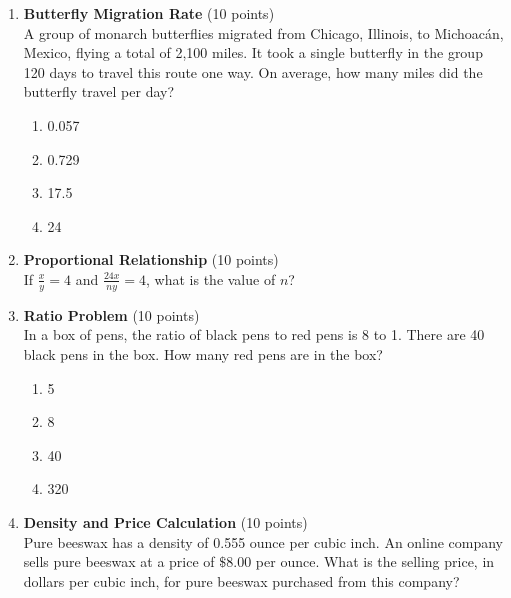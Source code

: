 \begin{enumerate}
  \item \textbf{Butterfly Migration Rate} (10 points)\\
  A group of monarch butterflies migrated from Chicago, Illinois, to Michoacán, Mexico, flying a total of 2,100 miles. It took a single butterfly in the group 120 days to travel this route one way. On average, how many miles did the butterfly travel per day?
  \begin{enumerate}[label=(\Alph*)]
    \item 0.057
    \item 0.729
    \item 17.5
    \item 24
  \end{enumerate}
  \begin{subanswer}
  \end{subanswer}

  \item \textbf{Proportional Relationship} (10 points)\\
  If $\frac{x}{y}=4$ and $\frac{24 x}{n y}=4$, what is the value of $n$?
  \begin{subanswer}
  \end{subanswer}

  \item \textbf{Ratio Problem} (10 points)\\
  In a box of pens, the ratio of black pens to red pens is 8 to 1. There are 40 black pens in the box. How many red pens are in the box?
  \begin{enumerate}[label=(\Alph*)]
    \item 5
    \item 8
    \item 40
    \item 320
  \end{enumerate}
  \begin{subanswer}
  \end{subanswer}

  \item \textbf{Density and Price Calculation} (10 points)\\
  Pure beeswax has a density of 0.555 ounce per cubic inch. An online company sells pure beeswax at a price of $\$ 8.00$ per ounce. What is the selling price, in dollars per cubic inch, for pure beeswax purchased from this company?
  \begin{subanswer}
  \end{subanswer}


\end{enumerate}

